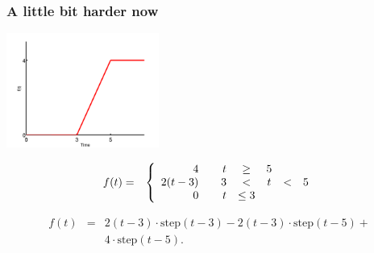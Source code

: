 \begin{frame}
  \frametitle{A little bit harder now}

  \centerline{\includegraphics[width=5cm]{img/stepEx4}}

  \begin{eqnarray*}
      f(t) & = & 
      \left\{
        \begin{array}{r@{\hspace{2em}}rcccl}
          4 & t & \geq & 5 \\
          2(t-3) & 3 & < & t & < & 5 \\
          0 & t & \leq 3 
        \end{array}
      \right.
  \end{eqnarray*}

  {
    \begin{eqnarray*}
      f(t) & = & 2(t-3)\cdot\mathrm{step}(t-3) -
                 2(t-3)\cdot\mathrm{step}(t-5) + \\
           &   & 4\cdot\mathrm{step}(t-5).
    \end{eqnarray*}
  }


\end{frame}


